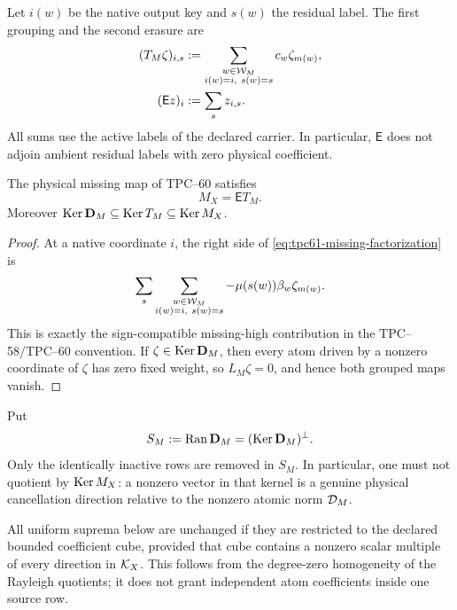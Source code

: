 Let \(i(w)\) be the native output key and \(s(w)\) the residual label.
The first grouping and the second erasure are
\begin{align}
 (T_M\zeta)_{i,s}
 &:=
 \sum_{\substack{w\in\mathcal W_M\\i(w)=i,\ s(w)=s}}
 c_w\zeta_{m(w)},
 \label{eq:tpc61-residual-map}\\
 (\mathsf E z)_i&:=\sum_s z_{i,s}.
 \label{eq:tpc61-native-erasure}
\end{align}
All sums use the active labels of the declared carrier.  In particular,
\(\mathsf E\) does not adjoin ambient residual labels with zero physical
coefficient.

\begin{proposition}
\label{prop:tpc61-three-level-factorization}
The physical missing map of TPC--60 satisfies
\begin{equation}
 \boxed{M_X=\mathsf E T_M.}
 \label{eq:tpc61-missing-factorization}
\end{equation}
Moreover \(\operatorname{Ker}\mathbf D_M\subseteq\operatorname{Ker} T_M\subseteq\operatorname{Ker} M_X\).
\end{proposition}

\begin{proof}
At a native coordinate \(i\), the right side of
\eqref{eq:tpc61-missing-factorization} is
\[
 \sum_s\sum_{\substack{w\in\cW_M\\i(w)=i,\ s(w)=s}}
 -\mu(s(w))\beta_w\zeta_{m(w)}.
\]
This is exactly the sign-compatible missing-high contribution in the
TPC--58/TPC--60 convention.  If
\(\zeta\in\operatorname{Ker}\mathbf D_M\), then every atom driven by a nonzero coordinate
of \(\zeta\) has zero fixed weight, so \(L_M\zeta=0\), and hence both
grouped maps vanish.
\end{proof}

Put
\begin{equation}
 S_M:=\operatorname{Ran}\mathbf D_M=(\operatorname{Ker}\mathbf D_M)^\perp.
 \label{eq:tpc61-active-row-space}
\end{equation}
Only the identically inactive rows are removed in \(S_M\).  In particular,
one must not quotient by \(\operatorname{Ker} M_X\): a nonzero vector in that kernel is a
genuine physical cancellation direction relative to the nonzero atomic
norm \(\mathcal D_M\).

All uniform suprema below are unchanged if they are restricted to the
declared bounded coefficient cube, provided that cube contains a nonzero
scalar multiple of every direction in \(\mathcal K_X\).  This follows from the
degree-zero homogeneity of the Rayleigh quotients; it does not grant
independent atom coefficients inside one source row.

